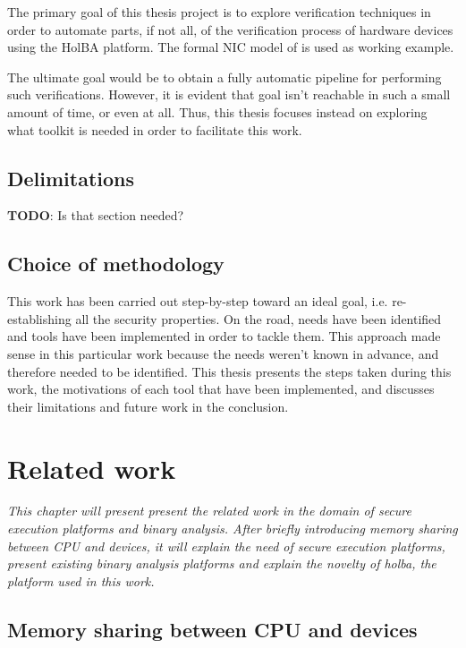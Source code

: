 \documentclass{kththesis}
\begin{document}
The primary goal of this thesis project is to explore verification techniques in order to automate parts, if not all, of the verification process of hardware devices using the HolBA platform. The formal \gls{NIC} model of \cite{haglund_formal_2016} is used as working example.

The ultimate goal would be to obtain a fully automatic pipeline for performing such verifications. However, it is evident that goal isn't reachable in such a small amount of time, or even at all. Thus, this thesis focuses instead on exploring what toolkit is needed in order to facilitate this work.

\section{Delimitations}
\textbf{TODO}: Is that section needed?

\section{Choice of methodology}

This work has been carried out step-by-step toward an ideal goal, i.e. re-establishing all the security properties. On the road, needs have been identified and tools have been implemented in order to tackle them. This approach made sense in this particular work because the needs weren't known in advance, and therefore needed to be identified. This thesis presents the steps taken during this work, the motivations of each tool that have been implemented, and discusses their limitations and future work in the conclusion.

\chapter{Related work} \label{related-work}
\vspace{-1cm}
\textit{This chapter will present present the related work in the domain of secure execution platforms and binary analysis. After briefly introducing memory sharing between \gls{CPU} and devices, it will explain the need of secure execution platforms, present existing binary analysis platforms and explain the novelty of \gls{holba}, the platform used in this work.}

\section{Memory sharing between CPU and devices}
\end{document}
